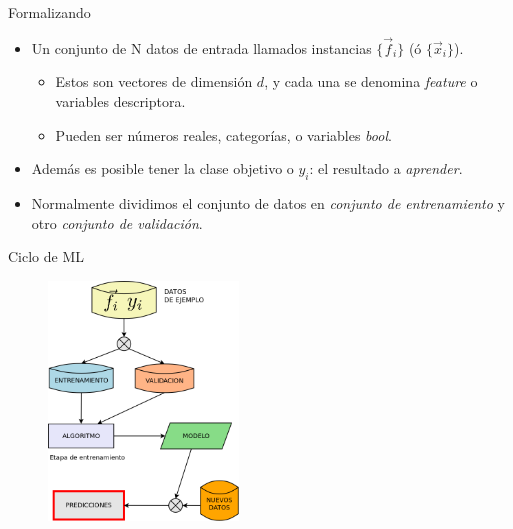 \documentclass[11pt]{beamer}
\begin{document}
\begin{frame}{Formalizando}
\begin{itemize}
    \item Un conjunto de N datos de entrada llamados instancias $\{\vec{f}_i\}$ (\'o $\{\vec{x}_i\}$).
    \begin{itemize}
        \item Estos son vectores de dimensi\'on $d$, y cada una se denomina \textit{feature} o variables descriptora.
        \item Pueden ser n\'umeros reales, categor\'ias, o variables \textit{bool}.
    \end{itemize}
    \item Adem\'as es posible tener la clase objetivo o $y_i$: el resultado a \textit{aprender}.
    \item Normalmente dividimos el conjunto de datos en \textit{conjunto de entrenamiento} y otro \textit{conjunto de validaci\'on}.
\end{itemize}
\end{frame}
\begin{frame}{Ciclo de ML}
\begin{figure}
    \centering
\includegraphics[width=0.45\textwidth]{images/ml_cycle.png}
    \label{fig:ml_cycle}
\end{figure}
\end{frame}
\end{document}
